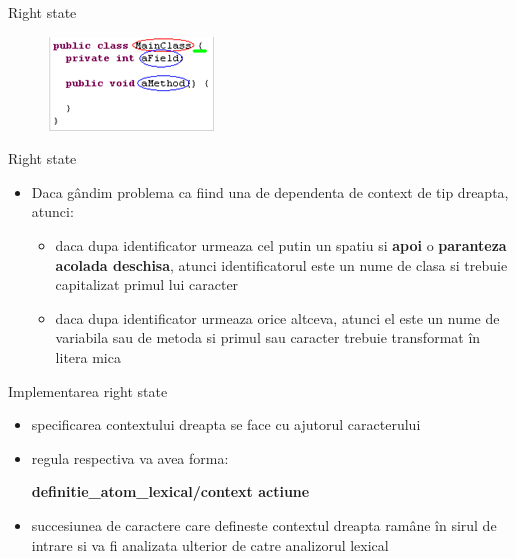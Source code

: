 \documentclass[pdf]{beamer}
\begin{document}
\begin{frame}{Right state}

\begin{figure}
\centering
\includegraphics[scale=1.5]{compil2.PNG}
\end{figure}

\end{frame}



\begin{frame}{Right state}
\begin{itemize}
\item
Daca gândim problema ca fiind una de dependenta de context de tip dreapta, atunci:

\begin{itemize}
\item
daca dupa identificator urmeaza cel putin un spatiu si \textbf{apoi} o \textbf{paranteza acolada deschisa}, atunci identificatorul este un nume de clasa si trebuie capitalizat primul lui caracter
\newline

\item
daca dupa identificator urmeaza orice altceva, atunci el este un nume de variabila sau de metoda si primul sau caracter trebuie transformat în litera mica
\end{itemize}

\end{itemize}
\end{frame}



\begin{frame}{Implementarea right state}
\begin{itemize}
\item
specificarea contextului dreapta se face cu ajutorul caracterului \color{red}{/} \color{black}{}

\item
regula respectiva  va avea forma: 

\textbf{definitie\_atom\_lexical/context actiune} \\

\item
succesiunea de caractere care defineste contextul dreapta ramâne în sirul de intrare si va fi analizata ulterior de catre analizorul lexical

\end{itemize}
\end{frame}
\end{document}
